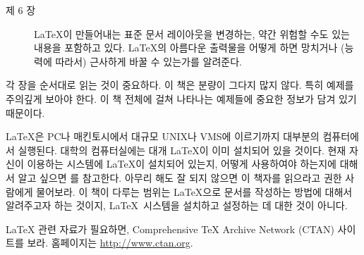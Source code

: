 \begin{description}
\item[제 6 장] \LaTeX 이 만들어내는 표준 문서 레이아웃을 변경하는,
약간 위험할 수도 있는 내용을 포함하고 있다. \LaTeX 의 아름다운 출력물을 어떻게 하면 망치거나 (능력에 따라서) 근사하게 바꿀 수 있는가를 알려준다.
\end{description}
\bigskip
\noindent 각 장을 순서대로 읽는 것이 중요하다. 이 책은 분량이 그다지 많지 않다. 특히
예제를 주의깊게 보아야 한다. 이 책 전체에 걸쳐 나타나는 예제들에 중요한 정보가 담겨 있기
때문이다. 

\bigskip
\noindent \LaTeX 은 PC나 매킨토시에서 대규모 UNIX나 VMS에 이르기까지 대부분의
컴퓨터에서 실행된다. 대학의 컴퓨터실에는 대개 \LaTeX 이 이미 설치되어 있을 것이다. 현재
자신이 이용하는 시스템에 \LaTeX 이 설치되어 있는지, 어떻게 사용하여야 하는지에 대해서 알고
싶으면 \guide 를 참고한다. 아무리 해도 잘 되지 않으면 이 책자를 읽으라고 권한 사람에게
물어보라.  이 책이 다루는 범위는 \LaTeX 으로 문서를 작성하는 방법에 대해서 알려주고자 하는
것이지, \LaTeX\ 시스템을 설치하고 설정하는 데 대한 것이 아니다.

\bigskip
\noindent \LaTeX{} 관련 자료가 필요하면, 
Comprehensive \TeX{} Archive Network (CTAN) 사이트를 보라. 홈페이지는
\url{http://www.ctan.org}.

